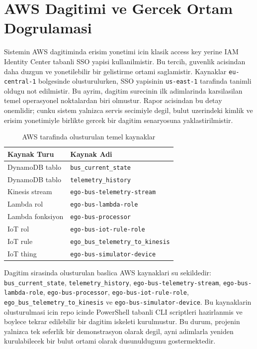 \section{AWS Dagitimi ve Gercek Ortam Dogrulamasi}

Sistemin AWS dagitiminda erisim yonetimi icin klasik access key yerine IAM Identity Center tabanli SSO yapisi kullanilmistir. Bu tercih, guvenlik acisindan daha duzgun ve yonetilebilir bir gelistirme ortami saglamistir. Kaynaklar \texttt{eu-central-1} bolgesinde olusturulurken, SSO yapisinin \texttt{us-east-1} tarafinda tanimli oldugu not edilmistir. Bu ayrim, dagitim surecinin ilk adimlarinda karsilasilan temel operasyonel noktalardan biri olmustur. Rapor acisindan bu detay onemlidir; cunku sistem yalnizca servis secimiyle degil, bulut uzerindeki kimlik ve erisim yonetimiyle birlikte gercek bir dagitim senaryosuna yaklastirilmistir.

\begin{table}[!t]
    \caption{AWS tarafinda olusturulan temel kaynaklar}
    \label{tab:aws-resources}
    \centering
    \footnotesize
    \begin{tabular}{p{} p{}}
        \toprule
        Kaynak Turu & Kaynak Adi \\
        \midrule
        DynamoDB tablo & \texttt{bus\_current\_state} \\
        DynamoDB tablo & \texttt{telemetry\_history} \\
        Kinesis stream & \texttt{ego-bus-telemetry-stream} \\
        Lambda rol & \texttt{ego-bus-lambda-role} \\
        Lambda fonksiyon & \texttt{ego-bus-processor} \\
        IoT rol & \texttt{ego-bus-iot-rule-role} \\
        IoT rule & \texttt{ego\_bus\_telemetry\_to\_kinesis} \\
        IoT thing & \texttt{ego-bus-simulator-device} \\
        \bottomrule
    \end{tabular}
\end{table}

Dagitim sirasinda olusturulan baslica AWS kaynaklari su sekildedir: \texttt{bus\_current\_state}, \texttt{telemetry\_history}, \texttt{ego-bus-telemetry-stream}, \texttt{ego-bus-lambda-role}, \texttt{ego-bus-processor}, \texttt{ego-bus-iot-rule-role}, \texttt{ego\_bus\_telemetry\_to\_kinesis} ve \texttt{ego-bus-simulator-device}. Bu kaynaklarin olusturulmasi icin repo icinde PowerShell tabanli CLI scriptleri hazirlanmis ve boylece tekrar edilebilir bir dagitim iskeleti kurulmustur. Bu durum, projenin yalnizca tek seferlik bir demonstrasyon olarak degil, ayni adimlarla yeniden kurulabilecek bir bulut ortami olarak dusunuldugunu gostermektedir.

